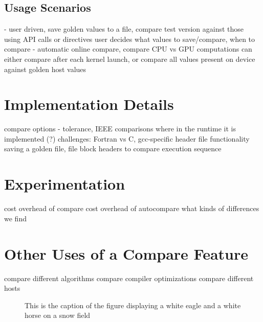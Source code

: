 \documentclass{llncs}
\begin{document}
\subsection{Usage Scenarios}
  - user driven, save golden values to a file, compare test version against those
    using API calls or directives
    user decides what values to save/compare, when to compare
  - automatic online compare, compare CPU vs GPU computations
    can either compare after each kernel launch, or
    compare all values present on device against golden host values


\section{Implementation Details}
   compare options - tolerance, IEEE comparisons
   where in the runtime it is implemented (?)
   challenges: Fortran vs C, gcc-specific header file functionality
   saving a golden file, file block headers to compare execution sequence

\section{Experimentation}
   cost overhead of compare
   cost overhead of autocompare
   what kinds of differences we find

\section{Other Uses of a Compare Feature}
   compare different algorithms
   compare compiler optimizations
   compare different hosts



\begin{figure}
\vspace{2.5cm}
\caption{This is the caption of the figure displaying a white eagle and
a white horse on a snow field}
\end{figure}
\end{document}
